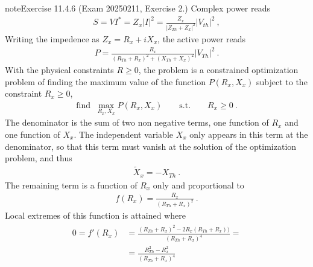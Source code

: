 \documentclass[letterpaper,10pt,english]{jupyterBook}
\begin{document}
\begin{sphinxadmonition}{note}{Exercise 11.4.6 (Exam 2025\sphinxhyphen{}02\sphinxhyphen{}11, Exercise 2.)}
\sphinxAtStartPar
{} Complex power reads
\begin{equation*}
\begin{split}S = V I^* = Z_x |I|^2 = \frac{Z_x}{|Z_{Th} + Z_x|^2} |V_{th}|^2 \ ,\end{split}
\end{equation*}
\sphinxAtStartPar
Writing the impedence as \(Z_x = R_x + i X_x\), the active power reads
\begin{equation*}
\begin{split}P = \frac{ R_x }{ (R_{Th} + R_x)^2 + (X_{Th} + X_x)^2} |V_{Th}|^2 \ .\end{split}
\end{equation*}
\sphinxAtStartPar
With the physical constraints \(R \ge 0\), the problem is a constrained optimization problem of finding the maximum value of the function \(P(R_x, X_x)\) subject to the constraint \(R_x \ge 0\),
\begin{equation*}
\begin{split}\text{find } \ \max_{R_x, X_x} P(R_x, X_x) \qquad \text{s.t.} \qquad R_x \ge 0 \ .\end{split}
\end{equation*}
\sphinxAtStartPar
The denominator is the sum of two non negative terms, one function of \(R_x\) and one function of \(X_x\). The independent variable \(X_x\) only appears in this term at the denominator, so that this term must vanish at the solution of the optimization problem, and thus
\begin{equation*}
\begin{split}\widetilde{X}_x = - X_{Th} \ .\end{split}
\end{equation*}
\sphinxAtStartPar
The remaining term is a function of \(R_x\) only and proportional to
\begin{equation*}
\begin{split}f(R_x) = \frac{R_x}{(R_{Th} + R_x)^2} \ .\end{split}
\end{equation*}
\sphinxAtStartPar
Local extremes of this function is attained where
\begin{equation*}
\begin{split}\begin{aligned}
  0 = f'(R_x) 
  & = \frac{(R_{Th} + R_x)^2 - 2 R_x (R_{Th} + R_x))}{(R_{Th} + R_x)^4} = \\
  & = \frac{R_{Th}^2 - R_x^2 }{(R_{Th} + R_x)^4} \\
\end{aligned}\end{split}

\end{equation*}
\end{sphinxadmonition}
\end{document}
